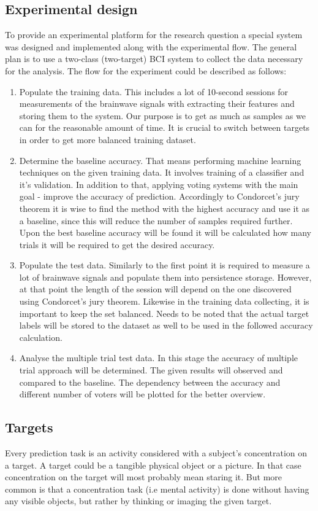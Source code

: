 \documentclass[12pt]{article}
\begin{document}
\subsection{Experimental design}
To provide an experimental platform for the research question a special system was designed and implemented along with the experimental flow. The general plan is to use a two-class (two-target) BCI system to collect the data necessary for the analysis. The flow for the experiment could be described as follows:
\begin{enumerate}
\item Populate the training data. This includes a lot of 10-second sessions for measurements of the brainwave signals with extracting their features and storing them to the system. Our purpose is to get as much as samples as we can for the reasonable amount of time. It is crucial to switch between targets in order to get more balanced training dataset.
\item Determine the baseline accuracy. That means performing machine learning techniques on the given training data. It involves training of a classifier and it's validation. In addition to that, applying voting systems with the main goal - improve the accuracy of prediction. Accordingly to Condorcet's jury theorem it is wise to find the method with the highest accuracy and use it as a baseline, since this will reduce the number of samples required further. Upon the best baseline accuracy will be found it will be calculated how many trials it will be required to get the desired accuracy.
\item Populate the test data. Similarly to the first point it is required to measure a lot of brainwave signals and populate them into persistence storage. However, at that point the length of the session will depend on the one discovered using Condorcet's jury theorem. Likewise in the training data collecting, it is important to keep the set balanced. Needs to be noted that the actual target labels will be stored to the dataset as well to be used in the followed accuracy calculation.
\item Analyse the multiple trial test data. In this stage the accuracy of multiple trial approach will be determined. The given results will observed and compared to the baseline. The dependency between the accuracy and different number of voters will be plotted for the better overview.
\end{enumerate}

\subsection{Targets}
Every prediction task is an activity considered with a subject's concentration on a target. A target could be a tangible physical object or a picture. In that case concentration on the target will most probably mean staring it. But more common is that a concentration task (i.e mental activity) is done without having any visible objects, but rather by thinking or imaging the given target. 
\end{document}

